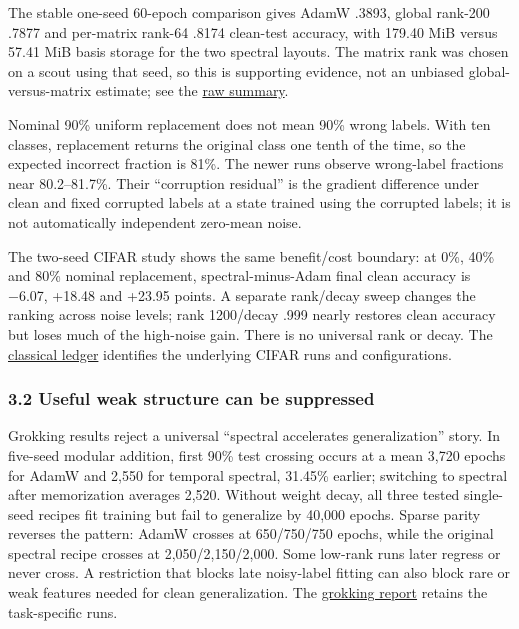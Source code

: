 \documentclass[
  british,
  10pt,
  a4paper,
]{article}
\begin{document}
The stable one-seed 60-epoch comparison gives AdamW .3893, global
rank-200 .7877 and per-matrix rank-64 .8174 clean-test accuracy, with
179.40 MiB versus 57.41 MiB basis storage for the two spectral layouts.
The matrix rank was chosen on a scout using that seed, so this is
supporting evidence, not an unbiased
global-\allowbreak{}versus-\allowbreak{}matrix estimate; see the
\href{../../../results/noisy_mnist_hard_curves/summary.json}{raw
summary}.

Nominal 90\% uniform replacement does not mean 90\% wrong labels. With
ten classes, replacement returns the original class one tenth of the
time, so the expected incorrect fraction is 81\%. The newer runs observe
wrong-\allowbreak{}label fractions near
80.\allowbreak{}2–81.\allowbreak{}7\%.\allowbreak{} Their ``corruption
residual'' is the gradient difference under clean and fixed corrupted
labels at a state trained using the corrupted labels; it is not
automatically independent zero-mean noise.

The two-seed CIFAR study shows the same benefit/\allowbreak{}cost
boundary: at 0\%, 40\% and 80\% nominal replacement,\allowbreak{}
spectral-\allowbreak{}minus-\allowbreak{}Adam final clean accuracy is
−6.07, +18.48 and +23.95 points. A separate rank/decay sweep changes the
ranking across noise levels; rank 1200/decay .999 nearly restores clean
accuracy but loses much of the high-noise gain. There is no universal
rank or decay. The \href{../analysis/classical-evidence.md}{classical
ledger} identifies the underlying CIFAR runs and
configuratio\allowbreak{}ns.\allowbreak{}

\subsubsection{3.2 Useful weak structure can be
suppressed}\label{synthesis--useful-weak-structure-can-be-suppressed}

Grokking results reject a universal ``spectral accelerates
generalization'' story. In five-seed modular addition, first 90\% test
crossing occurs at a mean 3,720 epochs for AdamW and 2,550 for temporal
spectral, 31.45\% earlier; switching to spectral after memorization
averages 2,520. Without weight decay, all three tested
single-\allowbreak{}seed recipes fit training but fail to generalize by
40,000 epochs. Sparse parity reverses the pattern: AdamW crosses at
650/\allowbreak{}750/\allowbreak{}750 epochs, while the original
spectral recipe crosses at
2,\allowbreak{}050/\allowbreak{}2,\allowbreak{}150/\allowbreak{}2,\allowbreak{}000.\allowbreak{}
Some low-rank runs later regress or never cross. A restriction that
blocks late noisy-\allowbreak{}label fitting can also block rare or weak
features needed for clean generalizati\allowbreak{}on.\allowbreak{} The
\href{../../../research/grokking_v2_findings.md}{grokking report}
retains the task-\allowbreak{}specific runs.
\end{document}
